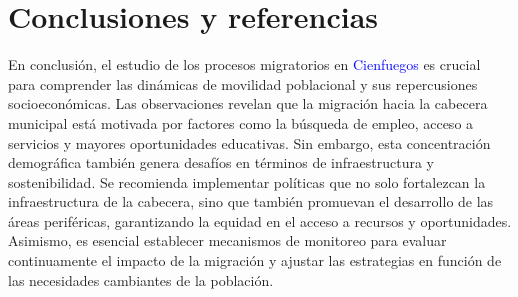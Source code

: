 \documentclass{article}
\begin{document}
\section{Conclusiones y referencias}
En conclusión, el estudio de los procesos migratorios en \textcolor{blue}{Cienfuegos} es crucial para comprender las dinámicas de movilidad poblacional y sus repercusiones socioeconómicas. Las observaciones revelan que la migración hacia la cabecera municipal está motivada por factores como la búsqueda de empleo, acceso a servicios y mayores oportunidades educativas. Sin embargo, esta concentración demográfica también genera desafíos en términos de infraestructura y sostenibilidad. Se recomienda implementar políticas que no solo fortalezcan la infraestructura de la cabecera, sino que también promuevan el desarrollo de las áreas periféricas, garantizando la equidad en el acceso a recursos y oportunidades. Asimismo, es esencial establecer mecanismos de monitoreo para evaluar continuamente el impacto de la migración y ajustar las estrategias en función de las necesidades cambiantes de la población.
\end{document}
